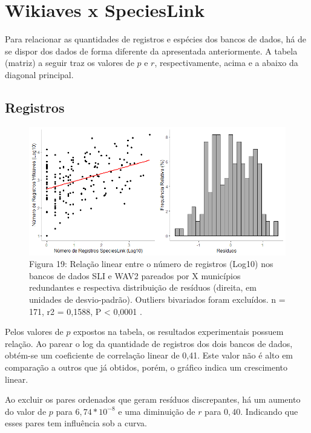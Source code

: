 \section{Wikiaves x SpeciesLink}

\hrulefill



\hrulefill


\begin{resposta}
Para relacionar as quantidades de registros e espécies dos bancos de dados, há de se dispor dos dados de forma diferente da apresentada anteriormente. A tabela (matriz) a seguir traz os valores de $p$ e $r$, respectivamente, acima e a abaixo da diagonal principal.
\end{resposta}

\newpage

\subsection{Registros}

\begin{figure}[h!]
\centering
\includegraphics[width = 12cm]{Imagens/G11.png}
\\{\scriptsize  Figura 19: Relação linear entre o número de registros (Log10) nos bancos de dados SLI e WAV2 pareados por X municípios redundantes e respectiva distribuição de resíduos (direita, em unidades de desvio-padrão). Outliers bivariados foram excluídos. n = 171, r2 = 0,1588, P < 0,0001 .}
\end{figure}

\begin{resposta}
Pelos valores de $p$ expostos na tabela, os resultados experimentais possuem relação. Ao parear o log da quantidade de registros dos dois bancos de dados, obtém-se um coeficiente de correlação linear de 0,41. Este valor não é alto em comparação a outros que já obtidos, porém, o gráfico indica um crescimento linear.

Ao excluir os pares ordenados que geram resíduos discrepantes, há um aumento do valor de $p$ para $6,74*10^{-8}$ e uma diminuição de $r$ para $0,40$. Indicando que esses pares tem influência sob a curva.
\end{resposta}




